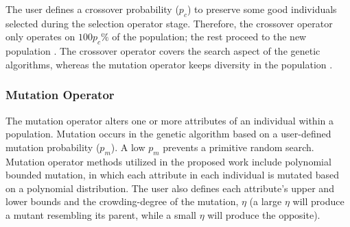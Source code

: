 The user defines a crossover probability ($p_c$) to preserve some good 
individuals selected during the selection operator stage.  
Therefore, the crossover operator only operates on $100p_c\%$ of the 
population; the rest proceed to the new population \cite{deb_multi-objective_2001}. 
The crossover operator covers the search aspect of the genetic algorithms, 
whereas the mutation operator keeps diversity in the population 
\cite{deb_multi-objective_2001}. 

\subsubsection{Mutation Operator}
The mutation operator alters one or more attributes of an individual within 
a population. 
Mutation occurs in the genetic algorithm based on a user-defined mutation 
probability ($p_m$). 
A low $p_m$ prevents a primitive random search. 
Mutation operator methods utilized in the proposed work include polynomial 
bounded mutation, in which each attribute in each individual is mutated 
based on a polynomial distribution. 
The user also defines each attribute's upper and lower bounds and the 
crowding-degree of the mutation, $\eta$ (a large $\eta$ will produce a mutant 
resembling its parent, while a small $\eta$ will produce the opposite).  


